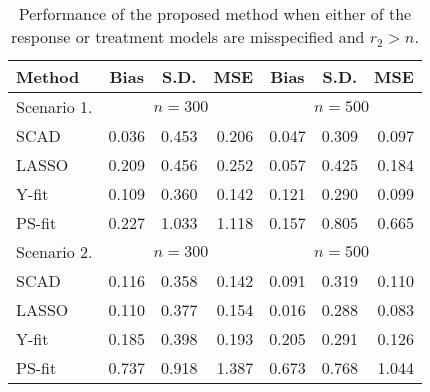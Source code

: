 \documentclass[11pt]{statsoc}
\begin{document}
\begin{table}
 \caption{\label{tab:miss} Performance of the proposed method when either of the response or treatment models are misspecified and $r_2>n$.}\centering
\begin{tabular}{lrrr|rrr|} \hline
Method   &\multicolumn{1}{c}{Bias} & \multicolumn{1}{c}{S.D.} & \multicolumn{1}{c|}{MSE} &
\multicolumn{1}{c}{Bias} & \multicolumn{1}{c}{S.D.} & \multicolumn{1}{c}{MSE}  \\ \hline
Scenario 1.               & \multicolumn{3}{c}{$n=300$} & \multicolumn{3}{c}{$n=500$} \\
SCAD  & 0.036& 0.453 &0.206&   0.047 &0.309 &0.097 \\
LASSO    &  0.209  &0.456 &0.252&0.057 &0.425&  0.184          \\
Y-fit   &         0.109 &0.360 &0.142&0.121& 0.290 &0.099 \\
PS-fit   &          0.227 &1.033 &1.118&  0.157 &0.805 &0.665 \\ \hline
Scenario 2.               & \multicolumn{3}{c}{$n=300$} & \multicolumn{3}{c}{$n=500$} \\
SCAD       &0.116 &0.358 &0.142&0.091 &0.319 &0.110 \\
LASSO     &    0.110 & 0.377 &0.154 &0.016 &0.288 &0.083         \\
Y-fit    &         0.185 &0.398 &0.193&0.205 &0.291 &0.126 \\
PS-fit   &          0.737 &0.918 &1.387& 0.673& 0.768 &1.044\\\hline 
\end{tabular}
\end{table}



\end{document}
